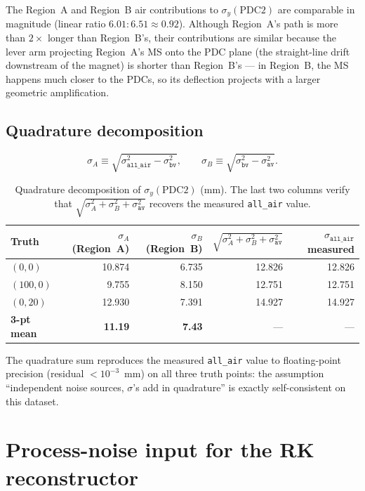 \documentclass[a4paper, 11pt]{article}
\begin{document}
The Region~A and Region~B air contributions to $\sigma_y(\mathrm{PDC2})$ are comparable in magnitude (linear ratio $6.01 : 6.51 \approx 0.92$). Although Region~A's path is more than $2\times$ longer than Region~B's, their contributions are similar because the lever arm projecting Region~A's MS onto the PDC plane (the straight-line drift downstream of the magnet) is shorter than Region~B's --- in Region~B, the MS happens much closer to the PDCs, so its deflection projects with a larger geometric amplification.

\subsection{Quadrature decomposition}

\[
   \sigma_{A} \equiv \sqrt{\sigma_{\mathtt{all\_air}}^{2} - \sigma_{\mathtt{bv}}^{2}}, \qquad
   \sigma_{B} \equiv \sqrt{\sigma_{\mathtt{bv}}^{2}     - \sigma_{\mathtt{av}}^{2}}.
\]

\begin{table}[H]
\centering
\caption{Quadrature decomposition of $\sigma_y(\mathrm{PDC2})$ (mm). The last two columns verify that $\sqrt{\sigma_A^{2}+\sigma_B^{2}+\sigma_{\mathtt{av}}^2}$ recovers the measured \texttt{all\_air} value.}
\label{tab:delta_quadrature}
\begin{tabular}{lrrrr}
\toprule
Truth & $\sigma_A$ (Region~A) & $\sigma_B$ (Region~B) & $\sqrt{\sigma_A^{2}+\sigma_B^{2}+\sigma_{\mathtt{av}}^2}$ & $\sigma_{\mathtt{all\_air}}$ measured \\
\midrule
$(0,0)$   & 10.874 & 6.735 & 12.826 & 12.826 \\
$(100,0)$ &  9.755 & 8.150 & 12.751 & 12.751 \\
$(0,20)$  & 12.930 & 7.391 & 14.927 & 14.927 \\
\midrule
\textbf{3-pt mean} & \textbf{11.19} & \textbf{7.43} & --- & --- \\
\bottomrule
\end{tabular}
\end{table}

The quadrature sum reproduces the measured \texttt{all\_air} value to floating-point precision (residual $< 10^{-3}$~mm) on all three truth points: the assumption ``independent noise sources, $\sigma$'s add in quadrature'' is exactly self-consistent on this dataset.

\section{Process-noise input for the RK reconstructor}
\end{document}
